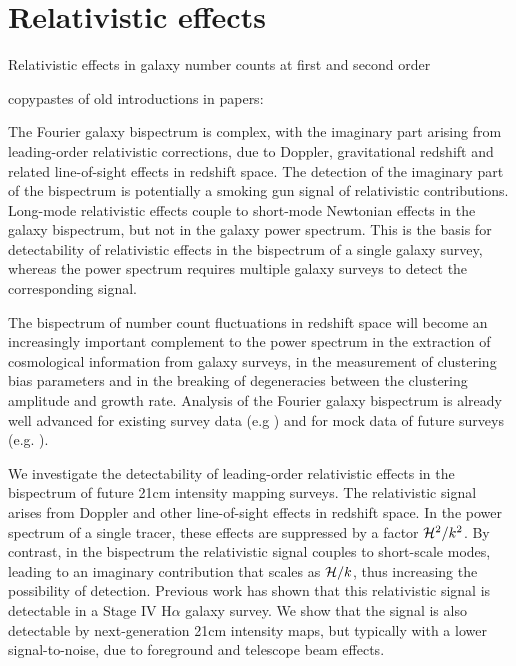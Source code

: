 \chapter{Relativistic effects}
\label{chapter:introreleff}



Relativistic effects in galaxy number counts at first and second order

copypastes of old introductions in papers:

The Fourier galaxy bispectrum is complex, with the imaginary part arising from leading-order relativistic corrections, due to Doppler, gravitational redshift  and related line-of-sight effects  in redshift space. The detection of the imaginary  part of the bispectrum is potentially a smoking gun signal of relativistic contributions. Long-mode relativistic effects couple to  short-mode Newtonian effects in the galaxy bispectrum, but not in the galaxy power spectrum. This is  the basis for detectability of relativistic effects in the bispectrum of a single galaxy survey, whereas the power spectrum requires multiple galaxy surveys to detect the corresponding signal.

The bispectrum of number count fluctuations in redshift space will become an increasingly important complement to the power spectrum in the extraction of cosmological information from galaxy surveys, 
{in the measurement of {clustering} bias parameters and in the breaking of degeneracies between the clustering amplitude and growth rate.}
Analysis of the Fourier galaxy bispectrum is already well advanced for existing survey data (e.g \cite{Gil-Marin:2016wya,Sugiyama:2018yzo}) and for mock data of future surveys (e.g. \cite{Karagiannis:2018jdt,Yankelevich:2018uaz,Oddo:2019run,Sugiyama:2019ike}). 

We investigate the detectability of leading-order relativistic effects in the bispectrum of future 21cm intensity  mapping surveys. The relativistic signal arises from Doppler and other line-of-sight effects in redshift space. In the power spectrum of a single tracer, these effects are suppressed by a factor $\mathcal{H}^2/k^2$. By contrast, in the bispectrum the relativistic signal couples to short-scale modes, leading to
an imaginary contribution that scales as $\mathcal{H}/k$, thus increasing the possibility of detection.
Previous work has shown that this relativistic signal is detectable in a Stage IV H$\alpha$ galaxy survey. 
{We show that the signal is also detectable by next-generation  21cm intensity maps, but typically with a lower signal-to-noise, due to foreground and telescope beam effects.}


